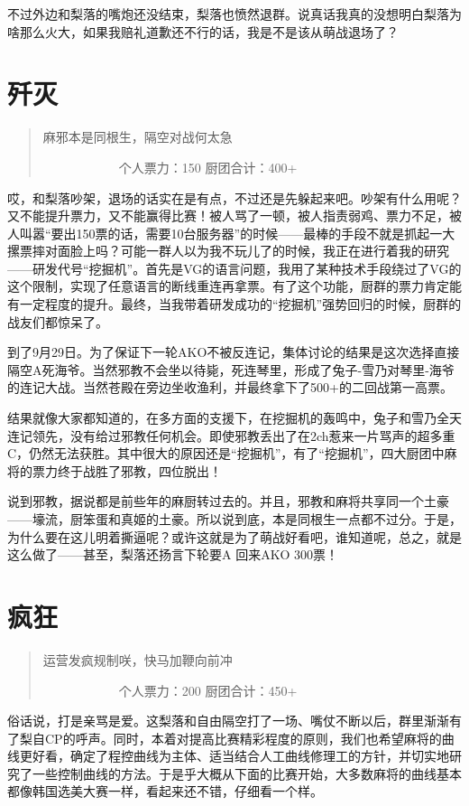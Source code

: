不过外边和梨落的嘴炮还没结束，梨落也愤然退群。说真话我真的没想明白梨落为啥那么火大，如果我赔礼道歉还不行的话，我是不是该从萌战退场了？


\section{歼灭}
\begin{quote}
麻邪本是同根生，隔空对战何太急

　　　　　　个人票力：150 厨团合计：400+
\end{quote}

哎，和梨落吵架，退场的话实在是有点，不过还是先躲起来吧。吵架有什么用呢？又不能提升票力，又不能赢得比赛！被人骂了一顿，被人指责弱鸡、票力不足，被人叫嚣“要出150票的话，需要10台服务器”的时候——最棒的手段不就是抓起一大摞票摔对面脸上吗？可能一群人以为我不玩儿了的时候，我正在进行着我的研究——研发代号“挖掘机”。首先是VG的语言问题，我用了某种技术手段绕过了VG的这个限制，实现了任意语言的断线重连再拿票。有了这个功能，厨群的票力肯定能有一定程度的提升。最终，当我带着研发成功的“挖掘机”强势回归的时候，厨群的战友们都惊呆了。

到了9月29日。为了保证下一轮AKO不被反连记，集体讨论的结果是这次选择直接隔空A死海爷。当然邪教不会坐以待毙，死连琴里，形成了兔子-雪乃对琴里-海爷的连记大战。当然苍殿在旁边坐收渔利，并最终拿下了500+的二回战第一高票。

结果就像大家都知道的，在多方面的支援下，在挖掘机的轰鸣中，兔子和雪乃全天连记领先，没有给过邪教任何机会。即使邪教丢出了在2ch惹来一片骂声的超多重C，仍然无法获胜。其中很大的原因还是“挖掘机”，有了“挖掘机”，四大厨团中麻将的票力终于战胜了邪教，四位脱出！

说到邪教，据说都是前些年的麻厨转过去的。并且，邪教和麻将共享同一个土豪——壕流，厨笨蛋和真姬的土豪。所以说到底，本是同根生一点都不过分。于是，为什么要在这儿明着撕逼呢？或许这就是为了萌战好看吧，谁知道呢，总之，就是这么做了——甚至，梨落还扬言下轮要A 回来AKO 300票！


\section{疯狂}
\begin{quote}
运营发疯规制咲，快马加鞭向前冲

　　　　　　个人票力：200 厨团合计：450+
\end{quote}

俗话说，打是亲骂是爱。这梨落和自由隔空打了一场、嘴仗不断以后，群里渐渐有了梨自CP的呼声。同时，本着对提高比赛精彩程度的原则，我们也希望麻将的曲线更好看，确定了程控曲线为主体、适当结合人工曲线修理工的方针，并切实地研究了一些控制曲线的方法。于是乎大概从下面的比赛开始，大多数麻将的曲线基本都像韩国选美大赛一样，看起来还不错，仔细看一个样。

